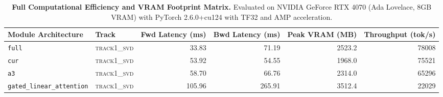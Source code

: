 \begin{table}[t]
\centering
\small
\caption{\textbf{Full Computational Efficiency and VRAM Footprint Matrix.} Evaluated on NVIDIA GeForce RTX 4070 (Ada Lovelace, 8GB VRAM) with PyTorch 2.6.0+cu124 with TF32 and AMP acceleration.}
\label{tab:efficiency_benchmark_results}
\begin{tabular}{l l r r r r}
\toprule
\textbf{Module Architecture} & \textbf{Track} & \textbf{Fwd Latency (ms)} & \textbf{Bwd Latency (ms)} & \textbf{Peak VRAM (MB)} & \textbf{Throughput (tok/s)} \\
\midrule
\texttt{full} & \textsc{track1\_svd} & 33.83 & 71.19 & 2523.2 & 78008 \\
\texttt{cur} & \textsc{track1\_svd} & 53.92 & 54.55 & 1968.0 & 75521 \\
\texttt{a3} & \textsc{track1\_svd} & 58.70 & 66.76 & 2314.0 & 65296 \\
\texttt{gated\_linear\_attention} & \textsc{track1\_svd} & 105.96 & 265.91 & 3512.4 & 22029 \\
\bottomrule
\end{tabular}
\end{table}